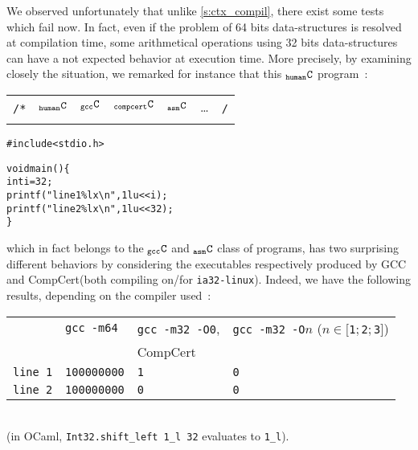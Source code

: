 \documentclass[a4paper, 11pt]{article}
\newenvironment{humC}
  {%
   \begin{alltt}
   \footnotesize}
  {\end{alltt} %
  }
\newcommand{\ccert}{CompCert\xspace}
\newcommand{\yes}{\ding{51}}
\newcommand{\C}{$_{\tt compcert}{\tt C}$\xspace}
\newcommand{\gccC}{$_{\tt gcc}{\tt C}$\xspace}
\newcommand{\hC}{$_{\tt human}{\tt C}$\xspace}
\newcommand{\aC}{$_{\tt asm}{\tt C}$\xspace}
\begin{document}
We observed unfortunately that unlike \ref{s:ctx_compil}, there exist some tests which fail now. In fact, even if the problem of 64 bits data-structures is resolved at compilation time, some arithmetical operations using 32 bits data-structures can have a not expected behavior at execution time.
More precisely, by examining closely the situation, we remarked for instance that this \hC program~:
{\newline\tiny
\begin{tabular}{rc|c|c|c|cl}
\multirow{2}{*}{{\footnotesize{\tt /*}}} & \hC  & \gccC  & \C & \aC & \ldots & \multirow{2}{*}{{\footnotesize{\tt */}}} \\
 & \yes & \yes & \yes & \yes & \\
\end{tabular}}
\begin{humC}
#include <stdio.h>

void main() \{
  int i = 32;
  printf("line 1 \%lx\textbackslash{}n", 1lu <<  i);
  printf("line 2 \%lx\textbackslash{}n", 1lu << 32);
\}
\end{humC}
which in fact belongs to the \gccC and \aC class of programs, has two surprising different behaviors by considering the executables respectively produced by GCC and \ccert (both compiling on/for \verb|ia32-linux|). Indeed, we have the following results, depending on the compiler used~:\\
\begin{tabular}{l|l|l|l}
& \verb|gcc -m64| & \verb|gcc -m32 -O0|, & \verb|gcc -m32 -O|$n$ ($n\in[$\verb|1|$; $\verb|2|$; $\verb|3|$]$) \\
&& \ccert & \\
\hline
\verb|line 1| & \verb|100000000| & \verb|1| & \verb|0| \\
\verb|line 2| & \verb|100000000| & \verb|0| & \verb|0| \\
\end{tabular} \\
(in OCaml, \verb|Int32.shift_left 1_l 32| evaluates to \verb|1_l|).
\end{document}
